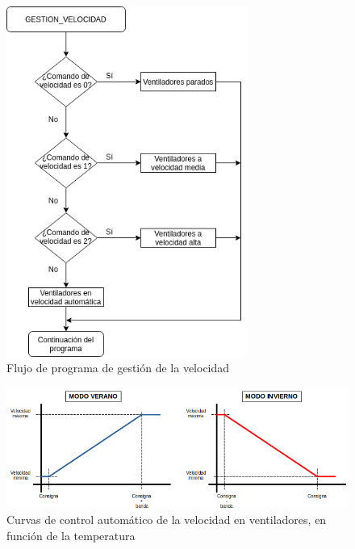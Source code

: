\begin{figure}[H]
    \centering
    \includegraphics[width=0.7\textwidth, keepaspectratio]{img/1-gestionVelocidad}
    \caption{Flujo de programa de gestión de la velocidad}
    \label{figura:gestionVelocidadVentiladores}
\end{figure}

   \vspace*{\fill}

\clearpage  

   \vspace*{\fill}

\begin{figure}[H]
    \centering
    \includegraphics[width=\textwidth, keepaspectratio]{img/2-gestionAutomatica}
    \caption{Curvas de control automático de la velocidad en ventiladores, en función de la temperatura}
    \label{figura:gestionAutomatica}
\end{figure}
  
